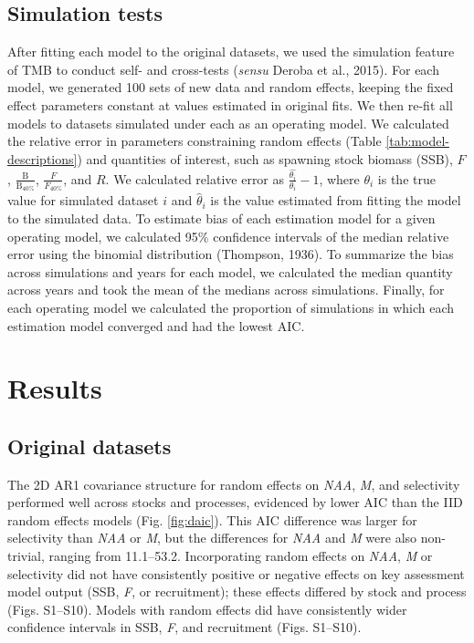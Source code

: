 \documentclass[]{article}
\begin{document}
\hypertarget{simulation-tests}{%
\subsection{Simulation tests}\label{simulation-tests}}

After fitting each model to the original datasets, we used the
simulation feature of TMB to conduct self- and cross-tests (\emph{sensu}
Deroba et al., 2015). For each model, we generated 100 sets of new data
and random effects, keeping the fixed effect parameters constant at
values estimated in original fits. We then re-fit all models to datasets
simulated under each as an operating model. We calculated the relative
error in parameters constraining random effects (Table
\ref{tab:model-descriptions}) and quantities of interest, such as
spawning stock biomass (SSB), \(F\),
\(\frac{\text{B}}{\text{B}_{40\%}}\), \(\frac{F}{F_{40\%}}\), and \(R\).
We calculated relative error as \(\frac{\hat{\theta_i}}{\theta_i}-1\),
where \(\theta_i\) is the true value for simulated dataset \(i\) and
\(\hat{\theta}_i\) is the value estimated from fitting the model to the
simulated data. To estimate bias of each estimation model for a given
operating model, we calculated 95\% confidence intervals of the median
relative error using the binomial distribution (Thompson, 1936). To
summarize the bias across simulations and years for each model, we
calculated the median quantity across years and took the mean of the
medians across simulations. Finally, for each operating model we
calculated the proportion of simulations in which each estimation model
converged and had the lowest AIC.

\hypertarget{results}{%
\section{Results}\label{results}}

\hypertarget{original-datasets}{%
\subsection{Original datasets}\label{original-datasets}}

The 2D AR1 covariance structure for random effects on \emph{NAA},
\emph{M}, and selectivity performed well across stocks and processes,
evidenced by lower AIC than the IID random effects models (Fig.
\ref{fig:daic}). This AIC difference was larger for selectivity than
\emph{NAA} or \emph{M}, but the differences for \emph{NAA} and \emph{M}
were also non-trivial, ranging from 11.1--53.2. Incorporating random
effects on \emph{NAA}, \emph{M} or selectivity did not have consistently
positive or negative effects on key assessment model output (SSB,
\emph{F}, or recruitment); these effects differed by stock and process
(Figs. S1--S10). Models with random effects did have consistently wider
confidence intervals in SSB, \emph{F}, and recruitment (Figs. S1--S10).
\end{document}

